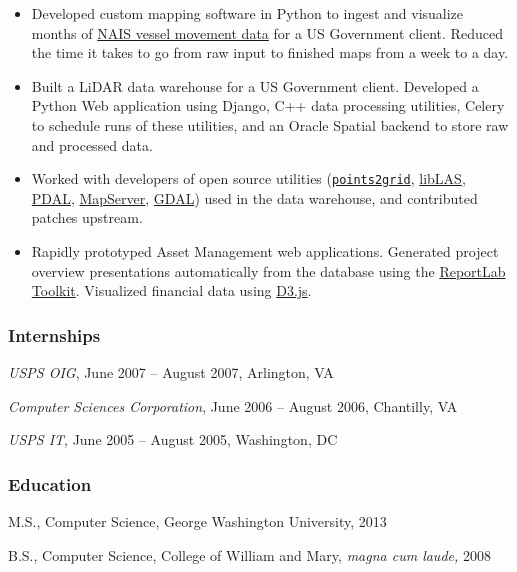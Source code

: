 \documentclass[]{rss}
\begin{document}
\begin{resume}
\begin{itemize}
\item
  Developed custom mapping software in Python to ingest and visualize
  months of \href{https://www.uscg.mil/acquisition/nais}{NAIS vessel
  movement data} for a US Government client. Reduced the time it takes
  to go from raw input to finished maps from a week to a day.
\item
  Built a LiDAR data warehouse for a US Government client. Developed a
  Python Web application using Django, C++ data processing utilities,
  Celery to schedule runs of these utilities, and an Oracle Spatial
  backend to store raw and processed data.
\item
  Worked with developers of open source utilities
  (\href{https://github.com/CRREL/points2grid}{\texttt{points2grid}},
  \href{https://www.liblas.org/}{libLAS},
  \href{https://www.pdal.io/}{PDAL},
  \href{http://mapserver.org/}{MapServer},
  \href{http://www.gdal.org/}{GDAL}) used in the data warehouse, and
  contributed patches upstream.
\item
  Rapidly prototyped Asset Management web applications. Generated
  project overview presentations automatically from the database using
  the \href{http://www.reportlab.com/opensource/}{ReportLab Toolkit}.
  Visualized financial data using \href{https://d3js.org/}{D3.js}.
\end{itemize}

\subsubsection{Internships}\label{internships}

\emph{USPS OIG}, June 2007 -- August 2007, Arlington, VA

\emph{Computer Sciences Corporation}, June 2006 -- August 2006,
Chantilly, VA

\emph{USPS IT}, June 2005 -- August 2005, Washington, DC

\subsubsection{Education}\label{education}

M.S., Computer Science, George Washington University, 2013

B.S., Computer Science, College of William and Mary, \emph{magna cum
laude,} 2008

\end{resume}
\end{document}
